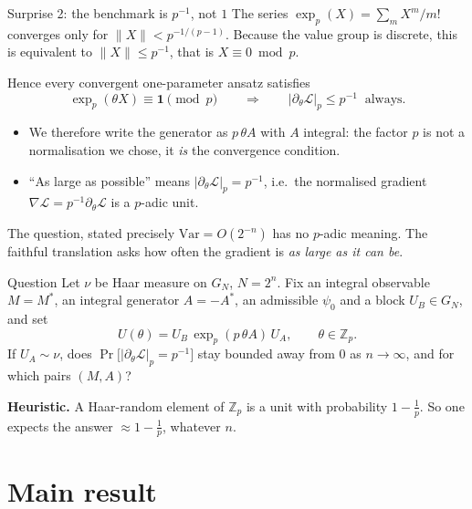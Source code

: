\documentclass[aspectratio=169,compress]{beamer}
\newcommand{\Zp}{\mathbb{Z}_p}
\newcommand{\Id}{\mathbf{1}}
\newcommand{\loss}{\mathcal{L}}
\newcommand{\padicnorm}[1]{\left|#1\right|_p}
\begin{document}
\begin{frame}{Surprise 2: the benchmark is $p^{-1}$, not $1$}
  The series $\exp_p(X)=\sum_m X^{m}/m!$ converges only for
  $\|X\|<p^{-1/(p-1)}$. Because the value group is discrete, this is
  \alert{equivalent} to $\|X\|\le p^{-1}$, that is $X\equiv0\bmod p$.
  \vspace{0.5em}

  Hence every convergent one-parameter ansatz satisfies
  \[
    \exp_p(\theta X)\equiv\Id\pmod p
    \qquad\Longrightarrow\qquad
    \padicnorm{\partial_\theta\loss}\le p^{-1}\ \text{ always.}
  \]
  \begin{itemize}
    \item We therefore write the generator as $p\,\theta A$ with $A$ integral:
      the factor $p$ is not a normalisation we chose, it \emph{is} the
      convergence condition.
    \item ``As large as possible'' means $\padicnorm{\partial_\theta\loss}
      =p^{-1}$, i.e.\ the normalised gradient
      $\nabla\loss=p^{-1}\partial_\theta\loss$ is a $p$-adic unit.
  \end{itemize}
\end{frame}

\begin{frame}{The question, stated precisely}
  $\mathrm{Var}=O(2^{-n})$ has no $p$-adic meaning. The faithful translation
  asks how often the gradient is \emph{as large as it can be}.
  \begin{block}{Question}
    Let $\nu$ be Haar measure on $G_N$, $N=2^{n}$. Fix an integral observable
    $M=M^*$, an integral generator $A=-A^*$, an admissible $\psi_0$ and a block
    $U_B\in G_N$, and set
    \[
      U(\theta)=U_B\,\exp_p(p\,\theta A)\,U_A,
      \qquad \theta\in\Zp .
    \]
    If $U_A\sim\nu$, does
    $\Pr\bigl[\padicnorm{\partial_\theta\loss}=p^{-1}\bigr]$ stay bounded away
    from $0$ as $n\to\infty$, and for which pairs $(M,A)$?
  \end{block}
  \textbf{Heuristic.} A Haar-random element of $\Zp$ is a unit with
  probability $1-\frac1p$. So one expects the answer $\approx1-\frac1p$,
  whatever $n$.
\end{frame}

\section[Result]{Main result}
\end{document}
